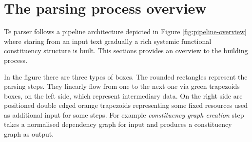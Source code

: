 

\section{The parsing process overview}
\label{sec:how-works}

Te parser follows a pipeline architecture depicted in Figure \ref{fig:pipeline-overview} where staring from an input text gradually a rich systemic functional constituency structure is built. This sections provides an overview to the building process. 

In the figure there are three types of boxes. The rounded rectangles represent the parsing steps. They linearly flow from one to the next one via green trapezoids boxes, on the left side, which represent intermediary data. On the right side are positioned double edged orange trapezoids representing some fixed resources used as additional input for some steps. For example \textit{constituency graph creation} step takes a normalised dependency graph for input and produces a constituency graph as output.



